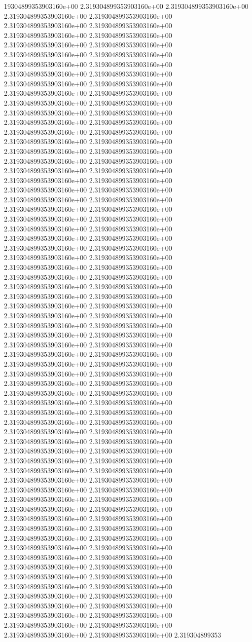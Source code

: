 19304899353903160e+00	2.319304899353903160e+00	2.319304899353903160e+00	2.319304899353903160e+00	2.319304899353903160e+00	2.319304899353903160e+00	2.319304899353903160e+00	2.319304899353903160e+00	2.319304899353903160e+00	2.319304899353903160e+00	2.319304899353903160e+00	2.319304899353903160e+00	2.319304899353903160e+00	2.319304899353903160e+00	2.319304899353903160e+00	2.319304899353903160e+00	2.319304899353903160e+00	2.319304899353903160e+00	2.319304899353903160e+00	2.319304899353903160e+00	2.319304899353903160e+00	2.319304899353903160e+00	2.319304899353903160e+00	2.319304899353903160e+00	2.319304899353903160e+00	2.319304899353903160e+00	2.319304899353903160e+00	2.319304899353903160e+00	2.319304899353903160e+00	2.319304899353903160e+00	2.319304899353903160e+00	2.319304899353903160e+00	2.319304899353903160e+00	2.319304899353903160e+00	2.319304899353903160e+00	2.319304899353903160e+00	2.319304899353903160e+00	2.319304899353903160e+00	2.319304899353903160e+00	2.319304899353903160e+00	2.319304899353903160e+00	2.319304899353903160e+00	2.319304899353903160e+00	2.319304899353903160e+00	2.319304899353903160e+00	2.319304899353903160e+00	2.319304899353903160e+00	2.319304899353903160e+00	2.319304899353903160e+00	2.319304899353903160e+00	2.319304899353903160e+00	2.319304899353903160e+00	2.319304899353903160e+00	2.319304899353903160e+00	2.319304899353903160e+00	2.319304899353903160e+00	2.319304899353903160e+00	2.319304899353903160e+00	2.319304899353903160e+00	2.319304899353903160e+00	2.319304899353903160e+00	2.319304899353903160e+00	2.319304899353903160e+00	2.319304899353903160e+00	2.319304899353903160e+00	2.319304899353903160e+00	2.319304899353903160e+00	2.319304899353903160e+00	2.319304899353903160e+00	2.319304899353903160e+00	2.319304899353903160e+00	2.319304899353903160e+00	2.319304899353903160e+00	2.319304899353903160e+00	2.319304899353903160e+00	2.319304899353903160e+00	2.319304899353903160e+00	2.319304899353903160e+00	2.319304899353903160e+00	2.319304899353903160e+00	2.319304899353903160e+00	2.319304899353903160e+00	2.319304899353903160e+00	2.319304899353903160e+00	2.319304899353903160e+00	2.319304899353903160e+00	2.319304899353903160e+00	2.319304899353903160e+00	2.319304899353903160e+00	2.319304899353903160e+00	2.319304899353903160e+00	2.319304899353903160e+00	2.319304899353903160e+00	2.319304899353903160e+00	2.319304899353903160e+00	2.319304899353903160e+00	2.319304899353903160e+00	2.319304899353903160e+00	2.319304899353903160e+00	2.319304899353903160e+00	2.319304899353903160e+00	2.319304899353903160e+00	2.319304899353903160e+00	2.319304899353903160e+00	2.319304899353903160e+00	2.319304899353903160e+00	2.319304899353903160e+00	2.319304899353903160e+00	2.319304899353903160e+00	2.319304899353903160e+00	2.319304899353903160e+00	2.319304899353903160e+00	2.319304899353903160e+00	2.319304899353903160e+00	2.319304899353903160e+00	2.319304899353903160e+00	2.319304899353903160e+00	2.319304899353903160e+00	2.319304899353903160e+00	2.319304899353903160e+00	2.319304899353903160e+00	2.319304899353903160e+00	2.319304899353903160e+00	2.319304899353903160e+00	2.319304899353903160e+00	2.319304899353903160e+00	2.319304899353903160e+00	2.319304899353903160e+00	2.319304899353903160e+00	2.319304899353903160e+00	2.319304899353903160e+00	2.319304899353903160e+00	2.319304899353903160e+00	2.319304899353